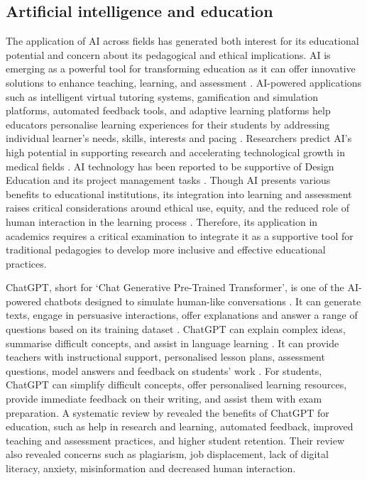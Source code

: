 \documentclass[english]{textolivre}
\begin{document}
\subsection{Artificial intelligence and education}
The application of AI across fields has generated both interest for its educational potential and concern about its pedagogical and ethical implications. AI is emerging as a powerful tool for transforming education as it can offer innovative solutions to enhance teaching, learning, and assessment \cite{dempere2023, ghiasvand2024, klimova2024}. AI-powered applications such as intelligent virtual tutoring systems, gamification and simulation platforms, automated feedback tools, and adaptive learning platforms help educators personalise learning experiences for their students by addressing individual learner’s needs, skills, interests and pacing \cite{strielkowski2024, szabo2024}. Researchers predict AI’s high potential in supporting research and accelerating technological growth in medical fields \cite{xue2023}. AI technology has been reported to be supportive of Design Education and its project management tasks \cite{chellappa2024}. Though AI presents various benefits to educational institutions, its integration into learning and assessment raises critical considerations around ethical use, equity, and the reduced role of human interaction in the learning process \cite{szabo2024, zou2023}. Therefore, its application in academics requires a critical examination to integrate it as a supportive tool for traditional pedagogies to develop more inclusive and effective educational practices.

ChatGPT, short for ‘Chat Generative Pre-Trained Transformer’, is one of the AI-powered chatbots designed to simulate human-like conversations \cite{xue2023}. It can generate texts, engage in persuasive interactions, offer explanations and answer a range of questions based on its training dataset \cite{chellappa2024, klimova2024}. ChatGPT can explain complex ideas, summarise difficult concepts, and assist in language learning \cite{abusaaleek2024, crcek2023, xiao2023}. It can provide teachers with instructional support, personalised lesson plans, assessment questions, model answers and feedback on students’ work \cite{elebyary2024, elsayary2024, ghiasvand2024}. For students, ChatGPT can simplify difficult concepts, offer personalised learning resources, provide immediate feedback on their writing, and assist them with exam preparation. A systematic review by \textcite{dempere2023} revealed the benefits of ChatGPT for education, such as help in research and learning, automated feedback, improved teaching and assessment practices, and higher student retention. Their review also revealed concerns such as plagiarism, job displacement, lack of digital literacy, anxiety, misinformation and decreased human interaction.
\end{document}
